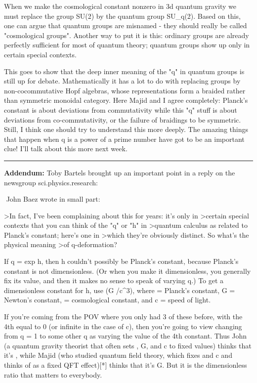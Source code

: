 When we make the cosmological constant nonzero in 3d quantum gravity we
must replace the group SU(2) by the quantum group SU_{q}(2).  Based on
this, one can argue that quantum groups are misnamed - they should
really be called "cosmological groups".  Another way to put it
is this: ordinary groups are already perfectly sufficient for most of
quantum theory; quantum groups show up only in certain special contexts.

This goes to show that the deep inner meaning of the "q" in
quantum groups is still up for debate.  Mathematically it has a lot to
do with replacing groups by non-cocommutative Hopf algebras, whose
representations form a braided rather than symmetric monoidal category.
Here Majid and I agree completely: Planck's constant is about deviations
from commutativity while this "q" stuff is about deviations
from co-commutativity, or the failure of braidings to be symmetric.
Still, I think one should try to understand this more deeply.  The
amazing things that happen when q is a power of a prime number have got
to be an important clue!  I'll talk about this more next week.


\par\noindent\rule{\textwidth}{0.4pt}
\textbf{Addendum:} Toby Bartels brought up an important point in a reply
on the newsgroup sci.physics.research:

$$
John Baez wrote in small part:

>In fact, I've been complaining about this for years: it's only in
>certain special contexts that you can think of the "q" or "h" in
>quantum calculus as related to Planck's constant; here's one in
>which they're obviously distinct.  So what's the physical meaning
>of q-deformation?

If q = exp h, then h couldn't possibly be Planck's constant,
because Planck's constant is not dimensionless.
(Or when you make it dimensionless, you generally fix its value,
and then it makes no sense to speak of varying q.)
To get a dimensionless constant for h, use (\hbar  G \Lambda /c^3),
where \hbar  = Planck's constant, G = Newton's constant,
\Lambda  = cosmological constant, and c = speed of light.

If you're coming from the POV where you only had 3 of these before,
with the 4th equal to 0 (or infinite in the case of c),
then you're going to view changing from q = 1 to some other q
as varying the value of the 4th constant.
Thus John (a quantum gravity theorist that often sets
\hbar , G, and c to fixed values) thinks that it's \Lambda ,
while Majid (who studied quantum field theory, which fixes \hbar  and c
and thinks of \Lambda  as a fixed QFT effect)[*] thinks that it's G.
But it is the dimensionless ratio that matters to everybody.

